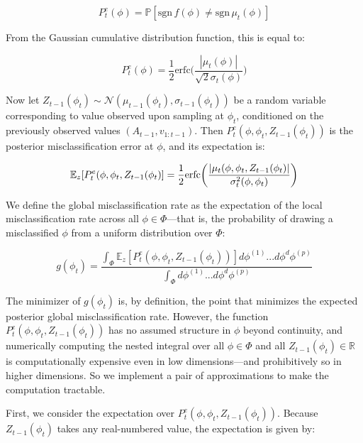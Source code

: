 \documentclass[letterpaper, 10 pt, conference]{ieeeconf}
\begin{document}
\begin{equation}
    P^e_t (\phi) = \mathbb{P}[\text{sgn}\,f(\phi)\neq \text{sgn}\,\mu_t(\phi)]
\end{equation}

From the Gaussian cumulative distribution function, this is equal to:

\begin{equation}
    P^e_t(\phi) = \frac{1}{2}\text{erfc}\bigg(\frac{|\mu_t(\phi)|}{\sqrt{2}\sigma_t(\phi)}\bigg)
\end{equation}
\smallskip

Now let $Z_{t-1}(\phi_t)\sim\mathcal{N}(\mu_{t-1}(\phi_t),\sigma_{t-1}(\phi_t))$ be a random variable corresponding to value observed upon sampling at $\phi_t$, conditioned on the previously observed values $(A_{t-1},v_{1:t-1})$. Then $P_t^e(\phi,\phi_t,Z_{t-1}(\phi_t))$ is the posterior misclassification error at $\phi$, and its expectation is:

\begin{equation}
    \small
    \mathbb{E}_{z}[P_t^e(\phi,\phi_t,Z_{t-1}(\phi_t)] = \frac{1}{2}\text{erfc}\bigg(\frac{|\mu_t(\phi,\phi_t,Z_{t-1}(\phi_t)|}{\sigma_t^2(\phi,\phi_t)}\bigg)
    \label{eq:exprec}
\end{equation}
\smallskip

We define the global misclassification rate as the expectation of the local misclassification rate across all $\phi\in\Phi$---that is, the probability of drawing a misclassified $\phi$ from a uniform distribution over $\Phi$:

\begin{equation}
    g(\phi_t) = \frac{\int_\Phi \mathbb{E}_{z}[P_t^e(\phi,\phi_t,Z_{t-1}(\phi_t))] d\phi^{(1)}...d\phi^d\phi^{(p)}}{\int_\Phi d\phi^{(1)}...d\phi^d\phi^{(p)}}
    \label{eq:objfull}
\end{equation}
\smallskip

The minimizer of $g(\phi_t)$ is, by definition, the point that minimizes the expected posterior global misclassification rate. However, the function $P_t^e(\phi,\phi_t,Z_{t-1}(\phi_t))$ has no assumed structure in $\phi$ beyond continuity, and numerically computing the nested integral over all $\phi\in\Phi$ and all $Z_{t-1}(\phi_t)\in\mathbb{R}$ is computationally expensive even in low dimensions---and prohibitively so in higher dimensions. So we implement a pair of approximations to make the computation tractable.

First, we consider the expectation over $P_t^e(\phi,\phi_t,Z_{t-1}(\phi_t))$. Because $Z_{t-1}(\phi_t)$ takes any real-numbered value, the expectation is given by:
\end{document}
